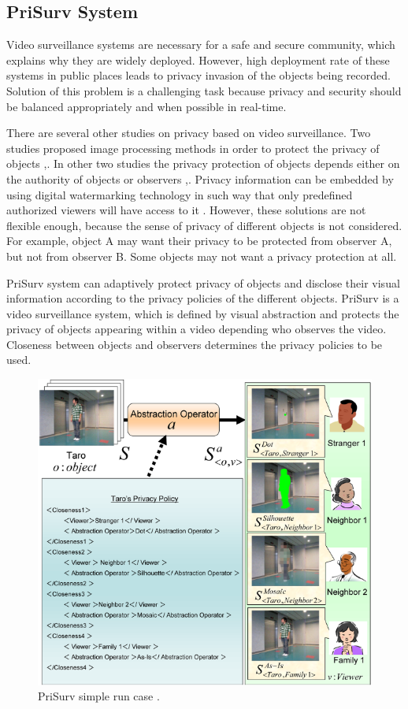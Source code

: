 \documentclass[conference]{IEEEtran}
\begin{document}
\subsection{PriSurv System}
Video surveillance systems are necessary for a safe and secure community, which explains why they are widely deployed. However, high deployment rate of these systems in public places leads to privacy invasion of the objects being recorded. Solution of this problem is a challenging task because privacy and security should be balanced appropriately and when possible in real-time.

There are several other studies on privacy based on video surveillance. Two studies proposed image processing methods in order to protect the privacy of objects \cite{cavallaro2005},\cite{kitahara2004}. In other two studies the privacy protection of objects depends either on the authority of objects or observers \cite{jehan2005},\cite{senior2005}. Privacy information can be embedded by using digital watermarking technology in such way that only predefined authorized viewers will have access to it \cite{zhang2005}. However, these solutions are not flexible enough, because the sense of privacy of different objects is not considered. For example, object A may want their privacy to be protected from observer A, but not from observer B. Some objects may not want a privacy protection at all. 

PriSurv system \cite{chinomi2008PriSurv} can adaptively protect privacy of objects and disclose their visual information according to the privacy policies of the different objects. PriSurv is a video surveillance system, which is defined by visual abstraction and protects the privacy of objects appearing within a video depending who observes the video. Closeness between objects and observers determines the privacy policies to be used. 

\begin{figure}[t]
\centerline{\includegraphics[width=.5\textwidth]{img//prisurv_simple_demo.png}}
\caption{PriSurv simple run case \cite{chinomi2008PriSurv}.}
\label{fig:prisurv}
\end{figure}
\end{document}
